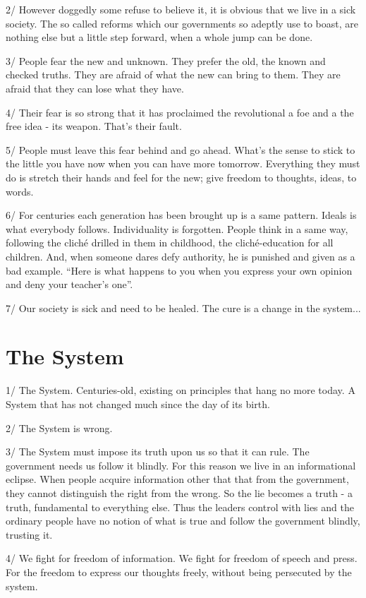 \documentclass[letterpaper,12pt,english]{sphinxmanual}
\begin{document}
2/ However doggedly some refuse to believe it, it is obvious that we live in a sick society. The so called reforms which our governments so adeptly use to boast, are nothing else but a little step forward, when a whole jump can be done.

3/ People fear the new and unknown. They prefer the old, the known and checked truths. They are afraid of what the new can bring to them. They are afraid that they can lose what they have.

4/ Their fear is so strong that it has proclaimed the revolutional a foe and a the free idea - its weapon. That's their fault.

5/ People must leave this fear behind and go ahead. What's the sense to stick to the little you have now when you can have more tomorrow. Everything they must do is stretch their hands and feel for the new; give freedom to thoughts, ideas, to words.

6/ For centuries each generation has been brought up is a same pattern. Ideals is what everybody follows. Individuality is forgotten. People think in a same way, following the cliché drilled in them in childhood, the cliché-education for all children. And, when someone dares defy authority, he is punished and given as a bad example. ``Here is what happens to you when you express your own opinion and deny your teacher's one''.

7/ Our society is sick and need to be healed. The cure is a change in the system...


\section{The System}
\label{1997:the-system}
1/ The System. Centuries-old, existing on principles that hang no more today. A System that has not changed much since the day of its birth.

2/ The System is wrong.

3/ The System must impose its truth upon us so that it can rule. The government needs us follow it blindly. For this reason we live in an informational eclipse. When people acquire information other that that from the government, they cannot distinguish the right from the wrong. So the lie becomes a truth - a truth, fundamental to everything else. Thus the leaders control with lies and the ordinary people have no notion of what is true and follow the government blindly, trusting it.

4/ We fight for freedom of information. We fight for freedom of speech and press. For the freedom to express our thoughts freely, without being persecuted by the system.
\end{document}
